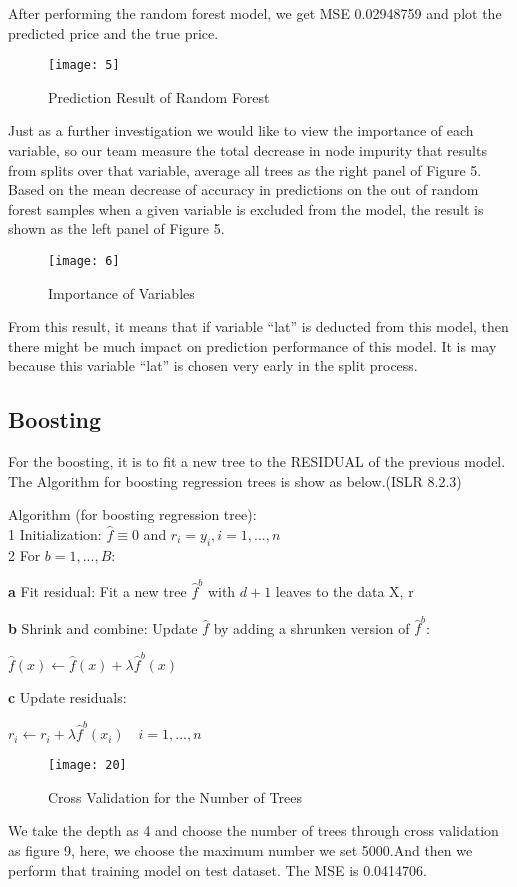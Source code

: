 \documentclass[12pt,twocolumn,twoside]{article}
\begin{document}
After performing the random forest model, we get MSE 0.02948759 and plot the predicted price and the true price.
\begin{figure}[h]
\texttt{[image: 5]}
\caption{Prediction Result of Random Forest}
\end{figure}
Just as a further investigation we would like to view the importance of each variable, so our team measure the total decrease in node impurity that results from splits over that variable, average all trees as the right panel of Figure 5. Based on the mean decrease of accuracy in predictions on the out of random forest samples when a given variable is excluded from the model, the result is shown as the left panel of Figure 5.
\begin{figure}[h]
\texttt{[image: 6]}
\caption{Importance of Variables}
\end{figure}
From this result, it means that if variable “lat” is deducted from this model, then there might be much impact on prediction performance of this model. It is may because this variable “lat” is chosen very early in the split process. 
\subsection{Boosting}
For the boosting, it is to fit a new tree to the RESIDUAL of the previous model. The Algorithm for boosting regression trees is show as below.(ISLR 8.2.3) 

Algorithm (for boosting regression tree):\\
1 Initialization: $\widehat{f}\equiv 0$ and $r_i =y_i, i=1,...,n$\\
2 For $b=1,...,B$:

\textbf{a} Fit residual: Fit a new tree $\widehat{f}^b$ with $d+1$ leaves to the data X, r

\textbf{b} Shrink and combine: Update $\widehat{f}$ by adding a shrunken version of $\widehat{f}^b$:
\begin{center}
$\widehat{f}(x)\leftarrow \widehat{f}(x) +\lambda \widehat{f}^b(x)$
\end{center}
\textbf{c} Update residuals:
\begin{center}
$r_i\leftarrow r_i +\lambda \widehat{f}^b(x_i) \quad i=1,...,n$
\end{center}
\begin{figure}[h]
\texttt{[image: 20]}
\caption{Cross Validation for the Number of Trees}
\end{figure}
We take the depth as 4 and choose the number of trees through cross validation as figure 9, here, we choose the maximum number we set 5000.And then we perform that training model on test dataset. The MSE is 0.0414706.
\end{document}
